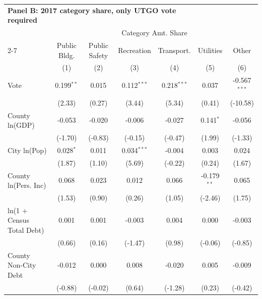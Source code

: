 \begingroup
\centering
\begin{tabular*}{\textwidth}{@{\extracolsep{\fill}}lcccccc}
\multicolumn{5}{l}{\textbf{Panel B: 2017 category share, only UTGO vote required}}\\

\addlinespace
   \toprule
    & \multicolumn{6}{c}{Category Amt. Share}\\
   \cmidrule(lr){2-7}
                             & Public Bldg.  & Public Safety & Recreation     & Transport.     & Utilities      & Other \\   
                             & (1)           & (2)           & (3)            & (4)            & (5)            & (6)\\  
   \midrule 
   Vote                      & 0.199$^{**}$  & 0.015         & 0.112$^{***}$  & 0.218$^{***}$  & 0.037          & -0.567$^{***}$\\   
                             & (2.33)       & (0.27)       & (3.44)        & (5.34)        & (0.41)        & (-10.58)\\   
   County ln(GDP)            & -0.053        & -0.020        & -0.006         & -0.027         & 0.141$^{*}$    & -0.056\\   
                             & (-1.70)      & (-0.83)      & (-0.15)       & (-0.47)       & (1.99)        & (-1.33)\\   
   City ln(Pop)              & 0.028$^{*}$   & 0.011         & 0.034$^{***}$  & -0.004         & 0.003          & 0.024\\   
                             & (1.87)       & (1.10)       & (5.69)        & (-0.22)       & (0.24)        & (1.67)\\   
   County ln(Pers. Inc)      & 0.068         & 0.023         & 0.012          & 0.066          & -0.179$^{**}$  & 0.065\\   
                             & (1.53)       & (0.90)       & (0.26)        & (1.05)        & (-2.46)       & (1.75)\\   
   ln(1 + Census Total Debt) & 0.001         & 0.001         & -0.003         & 0.004          & 0.000          & -0.003\\   
                             & (0.66)       & (0.16)       & (-1.47)       & (0.98)        & (-0.06)       & (-0.85)\\   
   County Non-City Debt      & -0.012        & 0.000         & 0.008          & -0.020         & 0.005          & -0.009\\   
                             & (-0.88)      & (-0.02)      & (0.64)        & (-1.28)       & (0.23)        & (-0.42)\\   

\end{tabular*}
